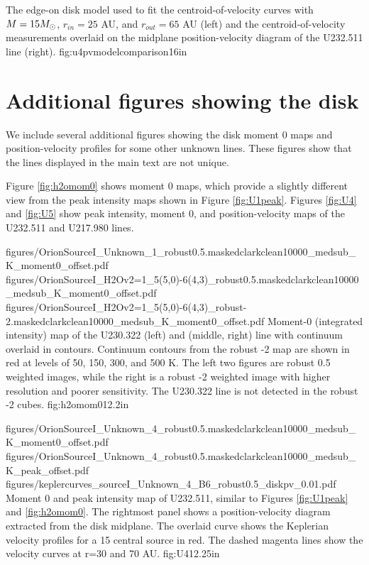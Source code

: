 \documentclass[twocolumn]{aastex61}
\begin{document}
{The edge-on disk model used to fit the centroid-of-velocity curves with
$M=15 M_{\odot}$, $r_{in}=25$ AU, and $r_{out}=65$ AU (left) and the centroid-of-velocity measurements
overlaid on the midplane position-velocity diagram of the U232.511 line (right).}
{fig:u4pvmodelcomparison}{1}{6in}

\section{Additional figures showing the disk}
\label{sec:ulinefigures}
We include several additional figures showing the disk moment 0 maps and
position-velocity profiles for some other unknown lines.  These figures show
that the lines displayed in the main text are not unique.

Figure \ref{fig:h2omom0} shows moment 0 maps, which provide a slightly
different view from the peak intensity maps shown in Figure \ref{fig:U1peak}.
Figures \ref{fig:U4} and \ref{fig:U5} show peak intensity, moment 0, and
position-velocity maps of the U232.511 and U217.980 lines.

\FigureThree
{{figures/OrionSourceI_Unknown_1_robust0.5.maskedclarkclean10000_medsub_K_moment0_offset}.pdf}
{{figures/OrionSourceI_H2Ov2=1_5(5,0)-6(4,3)_robust0.5.maskedclarkclean10000_medsub_K_moment0_offset}.pdf}
{{figures/OrionSourceI_H2Ov2=1_5(5,0)-6(4,3)_robust-2.maskedclarkclean10000_medsub_K_moment0_offset}.pdf}
{Moment-0 (integrated intensity) map of the U230.322 (left) and \water (middle,
right) line with continuum overlaid in contours.  Continuum contours
from the robust -2 map are shown
in red at levels of 
50, 150, 300, and 500 K.
The left two figures are robust 0.5 weighted images, while the right
is a robust -2 weighted image with higher resolution and poorer
sensitivity.  The U230.322 line is not detected in the robust -2 cubes.
}
{fig:h2omom0}{1}{2.2in}

\FigureThree
{{figures/OrionSourceI_Unknown_4_robust0.5.maskedclarkclean10000_medsub_K_moment0_offset}.pdf}
{{figures/OrionSourceI_Unknown_4_robust0.5.maskedclarkclean10000_medsub_K_peak_offset}.pdf}
{{figures/keplercurves_sourceI_Unknown_4_B6_robust0.5_diskpv_0.01}.pdf}
{Moment 0 and peak intensity map of U232.511, similar to Figures \ref{fig:U1peak} and \ref{fig:h2omom0}.
The rightmost panel shows a position-velocity diagram extracted from the disk midplane.
The overlaid  curve shows the Keplerian velocity profiles for a 15 \msun central source in red.
The dashed magenta lines show the velocity curves at r=30 and 70 AU.
}
{fig:U4}{1}{2.25in}
\end{document}
